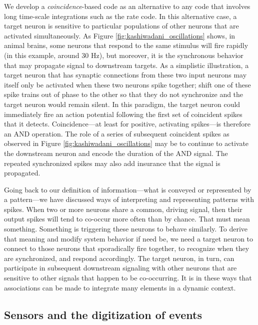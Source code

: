 We develop a \emph{coincidence}-based code as an alternative to any code that involves long time-scale integrations such as the rate code.
In this alternative case, a target neuron is sensitive to particular populations of other neurons that are activated simultaneously.
As Figure \ref{fig:kashiwadani_oscillations} shows, in animal brains, some neurons that respond to the same stimulus will fire rapidly (in this example, around 30 Hz), but moreover, it is the synchronous behavior that may propagate signal to downstream targets.
As a simplistic illustration, a target neuron that has synaptic connections from these two input neurons may itself only be activated when these two neurons spike together; shift one of these spike trains out of phase to the other so that they do not synchronize and the target neuron would remain silent.
In this paradigm, the target neuron could immediately fire an action potential following the first set of coincident spikes that it detects.
Coincidence---at least for positive, activating spikes---is therefore an AND operation.
The role of a series of subsequent coincident spikes as observed in Figure \ref{fig:kashiwadani_oscillations} may be to continue to activate the downstream neuron and encode the duration of the AND signal.
The repeated synchronized spikes may also add insurance that the signal is propagated.


Going back to our definition of information---what is conveyed or represented by a pattern---we have discussed ways of interpreting and representing patterns with spikes.
When two or more neurons share a common, driving signal, then their output spikes will tend to co-occur more often than by chance. 
That must mean something. 
Something is triggering these neurons to behave similarly. 
To derive that meaning and modify system behavior if need be, we need a target neuron to connect to those neurons that sporadically fire together, to recognize when they are synchronized, and respond accordingly.
The target neuron, in turn, can participate in subsequent downstream signaling with other neurons that are sensitive to other  signals that happen to be co-occurring.
It is in these ways that associations can be made to integrate many elements in a dynamic context.

\subsection{Sensors and the digitization of events}

